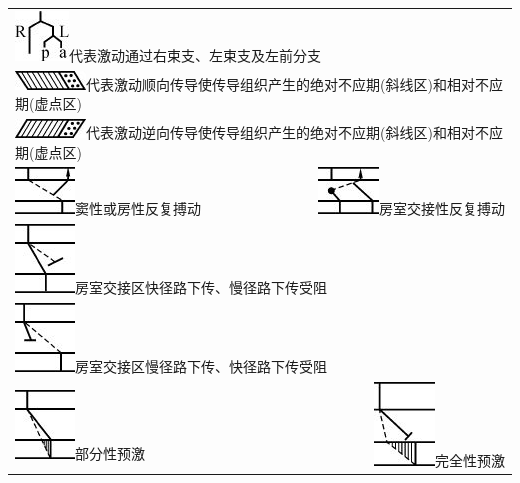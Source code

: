 \begin{longtable}{lr}
\multicolumn{2}{l}{\includegraphics{./images/Image00135.jpg}代表激动通过右束支、左束支及左前分支}\\
\multicolumn{2}{l}{\includegraphics{./images/Image00136.jpg}代表激动顺向传导使传导组织产生的绝对不应期(斜线区)和相对不应期(虚点区)}\\
\multicolumn{2}{l}{\includegraphics{./images/Image00137.jpg}代表激动逆向传导使传导组织产生的绝对不应期(斜线区)和相对不应期(虚点区)}\\
\includegraphics{./images/Image00138.jpg}窦性或房性反复搏动&\includegraphics{./images/Image00139.jpg}房室交接性反复搏动\\
\multicolumn{2}{l}{\includegraphics{./images/Image00141.jpg}房室交接区快径路下传、慢径路下传受阻}\\
\multicolumn{2}{l}{\includegraphics{./images/Image00142.jpg}房室交接区慢径路下传、快径路下传受阻}\\
\includegraphics{./images/Image00143.jpg}部分性预激&\includegraphics{./images/Image00144.jpg}完全性预激
\end{longtable}

